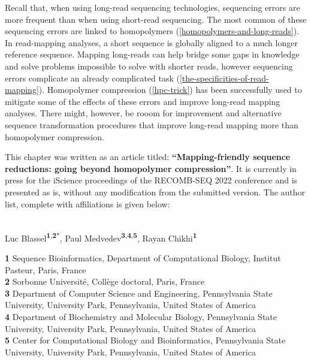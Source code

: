 \documentclass[
  11pt,
  twoside,
  BCOR=10mm,
  listof=totoc]{scrbook}
\begin{document}
Recall that, when using long-read sequencing technologies, sequencing errors are more frequent than when using short-read sequencing. The most common of these sequencing errors are linked to homopolymers (\ref{homopolymers-and-long-reads}).
In read-mapping analyses, a short sequence is globally aligned to a much longer reference sequence. Mapping long-reads can help bridge some gaps in knowledge and solve problems impossible to solve with shorter reads, however sequencing errors complicate an already complicated task (\ref{the-specificities-of-read-mapping}). Homopolymer compression (\ref{hpc-trick}) has been successfully used to mitigate some of the effects of these errors and improve long-read mapping analyses. There might, however, be rooom for improvement and alternative sequence transformation procedures that improve long-read mapping more than homopolymer compression.

This chapter was written as an article titled: \textbf{``Mapping-friendly sequence reductions: going beyond homopolymer compression''}. It is currently in press for the iScience proceedings of the RECOMB-SEQ 2022 conference and is presented as is, without any modification from the submitted version. The author list, complete with affiliations is given below:\\
\strut \\

Luc Blassel\textsuperscript{\textbf{1},\textbf{2}*}, Paul Medvedev\textsuperscript{\textbf{3},\textbf{4},\textbf{5}}, Rayan Chikhi\textsuperscript{\textbf{1}}

\textbf{1} Sequence Bioinformatics, Department of Computational Biology, Institut Pasteur, Paris, France\\
\textbf{2} Sorbonne Université, Collège doctoral, Paris, France\\
\textbf{3} Department of Computer Science and Engineering, Pennsylvania State University, University Park, Pennsylvania, United States of America\\
\textbf{4} Department of Biochemistry and Molecular Biology, Pennsylvania State University, University Park, Pennsylvania, United States of America\\
\textbf{5} Center for Computational Biology and Bioinformatics, Pennsylvania State University, University Park, Pennsylvania, United States of America\\
\strut \\

\newcommand{\stirling}[2]{\bigg\{%
\begin{matrix}
    #1 \\
    #2
\end{matrix}
\bigg\} }
\newcommand{\comb}[2]{\bigg(
\begin{matrix}
    #1 \\
    #2
\end{matrix}
\bigg) }
\end{document}
